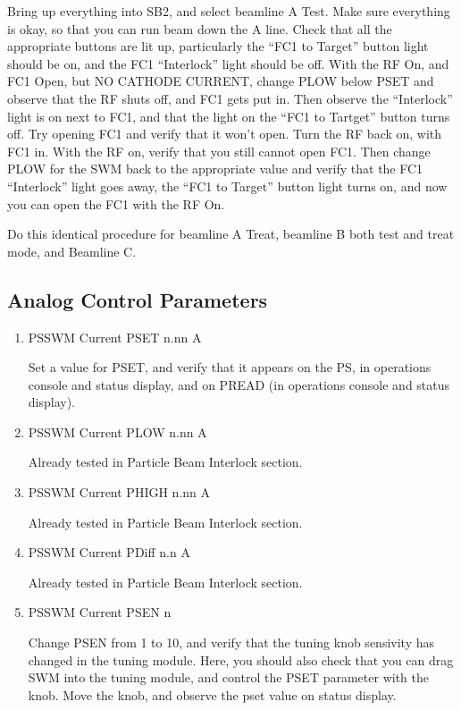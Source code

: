 \documentclass[11pt]{book}		%
\begin{document}
\color{red}

Bring up everything into SB2, and select beamline A Test. Make sure everything is okay, so that you can run beam down the A line. Check that all the appropriate buttons are lit up, particularly the ``FC1 to Target'' button light should be on, and the FC1 ``Interlock'' light should be off. With the RF On, and FC1 Open, but NO CATHODE CURRENT, change PLOW below PSET and observe that the RF shuts off, and FC1 gets put in. Then observe the ``Interlock'' light is on next to FC1, and that the light on the ``FC1 to Tartget'' button turns off. Try opening FC1 and verify that it won't open. Turn the RF back on, with FC1 in. With the RF on, verify that you still cannot open FC1. Then change PLOW for the SWM back to the appropriate value and verify that the FC1 ``Interlock'' light goes away, the ``FC1 to Target'' button light turns on, and now you can open the FC1 with the RF On.

Do this identical procedure for beamline A Treat, beamline B both test and treat mode, and Beamline C.

\color{black}

\subsection{Analog Control Parameters}

\begin{enumerate}
 \item PSSWM Current PSET  n.nn A

\color{red}
Set a value for PSET, and verify that it appears on the PS, in operations console and status display, and on PREAD (in operations console and status display).
\color{black}

 \item PSSWM Current PLOW  n.nn A

\color{red}
Already tested in Particle Beam Interlock section.
\color{black}

 \item PSSWM Current PHIGH n.nn A

\color{red}
Already tested in Particle Beam Interlock section.
\color{black}

 \item PSSWM Current PDiff n.n A

\color{red}
Already tested in Particle Beam Interlock section.
\color{black}

 \item PSSWM Current PSEN  n

\color{red}
Change PSEN from 1 to 10, and verify that the tuning knob sensivity has changed in the tuning module. Here, you should also check that you can drag SWM into the tuning module, and control the PSET parameter with the knob. Move the knob, and observe the pset value on status display.
\color{black}

\end{enumerate}
\end{document}
